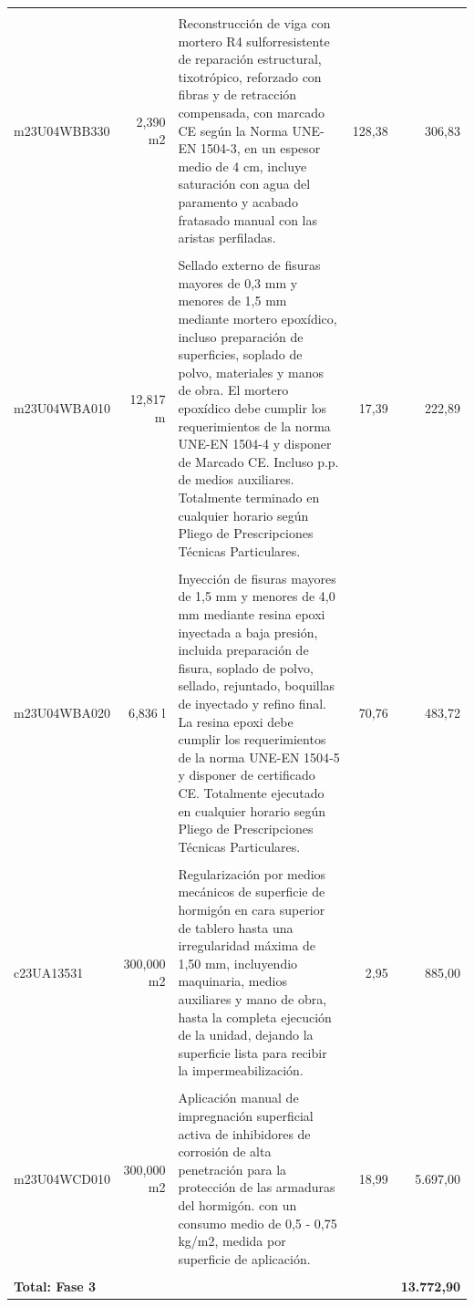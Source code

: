 \documentclass{book}%
\begin{document}
\begin{longtable}{lrlrr}
&&&&\\%
m23U04WBB330&     2,390 m2&\multicolumn{1}{p{5cm}}{Reconstrucción de viga con mortero R4 sulforresistente de reparación estructural, tixotrópico, reforzado con fibras y de retracción compensada, con marcado CE según la Norma UNE{-}EN 1504{-}3, en un espesor medio de 4 cm, incluye saturación con agua del paramento y acabado fratasado manual con las aristas perfiladas.}&    128,38&306,83\\%
&&&&\\%
m23U04WBA010&    12,817 m&\multicolumn{1}{p{5cm}}{Sellado externo de fisuras mayores de 0,3 mm y menores de 1,5 mm mediante mortero epoxídico, incluso preparación de superficies, soplado de polvo, materiales y manos de obra. El mortero epoxídico debe cumplir los requerimientos de la norma UNE{-}EN 1504{-}4 y disponer de Marcado CE. Incluso p.p. de medios auxiliares. Totalmente terminado en cualquier horario según Pliego de Prescripciones Técnicas Particulares.}&     17,39&222,89\\%
&&&&\\%
m23U04WBA020&     6,836 l&\multicolumn{1}{p{5cm}}{Inyección de fisuras mayores de 1,5 mm y menores de 4,0 mm mediante resina epoxi inyectada a baja presión, incluida preparación de fisura, soplado de polvo, sellado, rejuntado, boquillas de inyectado y refino final. La resina epoxi debe cumplir los requerimientos de la norma UNE{-}EN 1504{-}5 y disponer de certificado CE. Totalmente ejecutado en cualquier horario según Pliego de Prescripciones Técnicas Particulares.}&     70,76&483,72\\%
&&&&\\%
c23UA13531&   300,000 m2&\multicolumn{1}{p{5cm}}{Regularización por medios mecánicos de superficie de hormigón en cara superior de tablero hasta una irregularidad máxima de 1,50 mm, incluyendio maquinaria, medios auxiliares y mano de obra, hasta la completa ejecución de la unidad, dejando la superficie lista para recibir la impermeabilización.}&      2,95&885,00\\%
&&&&\\%
m23U04WCD010&   300,000 m2&\multicolumn{1}{p{5cm}}{Aplicación manual de impregnación superficial activa de inhibidores de corrosión de alta penetración para la protección de las armaduras del hormigón. con un consumo medio de 0,5 {-} 0,75 kg/m2, medida por superficie de aplicación.}&     18,99&5.697,00\\%
&&&&\\%
\multicolumn{4}{p{8cm}}{\textbf{Total: Fase 3}}&\textbf{13.772,90}\\%
\end{longtable}%
\normalsize
\end{document}
